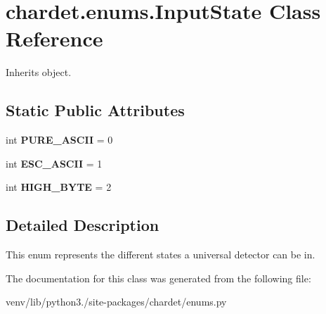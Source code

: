 \hypertarget{classchardet_1_1enums_1_1_input_state}{}\section{chardet.\+enums.\+Input\+State Class Reference}
\label{classchardet_1_1enums_1_1_input_state}


Inherits object.

\subsection*{Static Public Attributes}
\begin{DoxyCompactItemize}
\item 
\mbox{\label{classchardet_1_1enums_1_1_input_state_ae4b4699f387850ae8d6be5ea8687315c}} 
int {\bfseries P\+U\+R\+E\+\_\+\+A\+S\+C\+II} = 0
\item 
\mbox{\label{classchardet_1_1enums_1_1_input_state_a76c16a54de06a92c408a63c6a2601a65}} 
int {\bfseries E\+S\+C\+\_\+\+A\+S\+C\+II} = 1
\item 
\mbox{\label{classchardet_1_1enums_1_1_input_state_a054848f3709361c9c38ed12779d3d732}} 
int {\bfseries H\+I\+G\+H\+\_\+\+B\+Y\+TE} = 2
\end{DoxyCompactItemize}


\subsection{Detailed Description}
\begin{DoxyVerb}This enum represents the different states a universal detector can be in.
\end{DoxyVerb}
 

The documentation for this class was generated from the following file\+:\begin{DoxyCompactItemize}
\item 
venv/lib/python3./site-\/packages/chardet/enums.\+py\end{DoxyCompactItemize}
